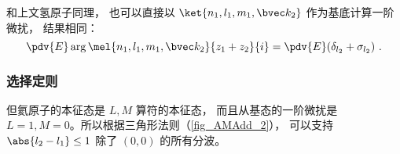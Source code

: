 和上文氢原子同理， 也可以直接以 $\ket{n_1, l_1, m_1, \bvec k_2}$ 作为基底计算一阶微扰， 结果相同：
\begin{equation}
\pdv{E} \arg\mel{n_1, l_1, m_1, \bvec k_2}{z_1 + z_2}{i} = \pdv{E} (\delta_{l_2} + \sigma_{l_2})~.
\end{equation}

\subsubsection{选择定则}
但氦原子的本征态是 $L,M$ 算符的本征态， 而且从基态的一阶微扰是 $L = 1, M = 0$。所以根据三角形法则（\autoref{fig_AMAdd_2}）， 可以支持 $\abs{l_2 - l_1} \le 1$ 除了 $(0,0)$ 的所有分波。
